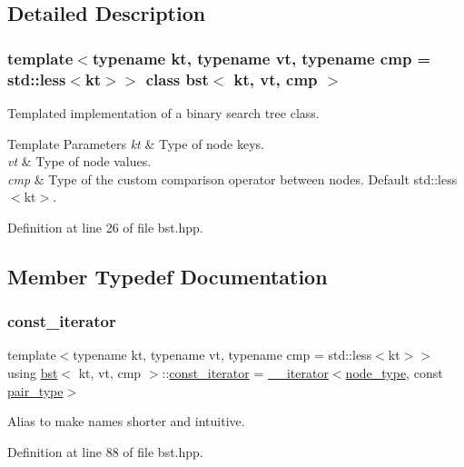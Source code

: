 \subsection{Detailed Description}
\subsubsection*{template$<$typename kt, typename vt, typename cmp = std\+::less$<$kt$>$$>$\newline
class bst$<$ kt, vt, cmp $>$}

Templated implementation of a binary search tree class. 


\begin{DoxyTemplParams}{Template Parameters}
{\em kt} & Type of node keys. \\
\hline
{\em vt} & Type of node values. \\
\hline
{\em cmp} & Type of the custom comparison operator between nodes. Default std\+::less$<$kt$>$. \\
\hline
\end{DoxyTemplParams}


Definition at line 26 of file bst.\+hpp.



\subsection{Member Typedef Documentation}
\mbox{\label{classbst_a72485696d999bf489c6156f6327a2163}} 
\subsubsection{\texorpdfstring{const\+\_\+iterator}{const\_iterator}}
{\footnotesize\ttfamily template$<$typename kt, typename vt, typename cmp = std\+::less$<$kt$>$$>$ \\
using \hyperlink{classbst}{bst}$<$ kt, vt, cmp $>$\+::\hyperlink{classbst_a72485696d999bf489c6156f6327a2163}{const\+\_\+iterator} =  \hyperlink{classbst_1_1____iterator}{\+\_\+\+\_\+iterator}$<$\hyperlink{classbst_a062eb2a1ac54802dbc4f0f74ae2afd01}{node\+\_\+type}, const \hyperlink{classbst_a7b11cca2a3b4394915600194f741ab16}{pair\+\_\+type}$>$}

Alias to make names shorter and intuitive. 

Definition at line 88 of file bst.\+hpp.

